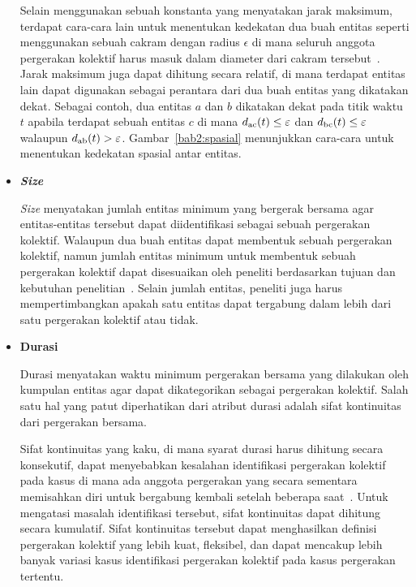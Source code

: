 \begin{itemize}
    Selain menggunakan sebuah konstanta yang menyatakan jarak maksimum, terdapat cara-cara lain untuk menentukan kedekatan dua buah entitas seperti menggunakan sebuah cakram dengan radius $\epsilon$ di mana seluruh anggota pergerakan kolektif harus masuk dalam diameter dari cakram tersebut~\cite{gudmundsson:flock}. Jarak maksimum juga dapat dihitung secara relatif, di mana terdapat entitas lain dapat digunakan sebagai perantara dari dua buah entitas yang dikatakan dekat. Sebagai contoh, dua entitas $a$ dan $b$ dikatakan dekat pada titik waktu $t$ apabila terdapat sebuah entitas $c$ di mana $d\textsubscript{ac}(t) \leq \varepsilon$ dan $d\textsubscript{bc}(t) \leq \varepsilon$ walaupun $d\textsubscript{ab}(t) > \varepsilon$. \iffalse \lionov{harus didefinisikan dulu sebelumnya kalo $d_{ac}(t)$ itu menyatakan jarak $a$ dan $c$ pada waktu $t$} \cristopher{udah di bagian~\ref{sec:kemiripan} ko} \fi Gambar~\ref{bab2:spasial} menunjukkan cara-cara untuk menentukan kedekatan spasial antar entitas.
    
    \item \textbf{\textit{Size}}
    
    \textit{Size} menyatakan jumlah entitas minimum yang bergerak bersama agar entitas-entitas tersebut dapat diidentifikasi sebagai sebuah pergerakan kolektif. Walaupun dua buah entitas dapat membentuk sebuah pergerakan kolektif, namun jumlah entitas minimum untuk membentuk sebuah pergerakan kolektif dapat disesuaikan oleh peneliti berdasarkan tujuan dan kebutuhan penelitian~\cite{wiratma:trajectory}. Selain jumlah entitas, peneliti juga harus mempertimbangkan apakah satu entitas dapat tergabung dalam lebih dari satu pergerakan kolektif atau tidak.
    
    \item \textbf{Durasi}
    
    Durasi menyatakan waktu minimum pergerakan bersama yang dilakukan oleh kumpulan entitas agar dapat dikategorikan sebagai pergerakan kolektif. Salah satu hal yang patut diperhatikan dari atribut durasi adalah sifat kontinuitas dari pergerakan bersama.
    
    Sifat kontinuitas yang kaku, di mana syarat durasi harus dihitung secara konsekutif, dapat menyebabkan kesalahan identifikasi pergerakan kolektif pada kasus di mana ada anggota pergerakan yang secara sementara memisahkan diri untuk bergabung kembali setelah beberapa saat~\cite{wiratma:trajectory}. Untuk mengatasi masalah identifikasi tersebut, sifat kontinuitas dapat dihitung secara kumulatif. Sifat kontinuitas tersebut dapat menghasilkan definisi pergerakan kolektif yang lebih kuat, fleksibel, dan dapat mencakup lebih banyak variasi kasus identifikasi pergerakan kolektif pada kasus pergerakan tertentu.
\end{itemize}

